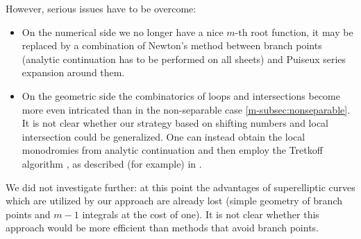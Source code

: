 \documentclass[main.tex]{subfiles}
\begin{document}
  However, serious issues have to be overcome:
  \begin{itemize}
      \item On the numerical side we no longer have a nice $m$-th root function,
          it may be replaced by a combination of Newton's method between branch
          points (analytic continuation has to
          be performed on all sheets) and
          Puiseux series expansion around them.
      \item On the geometric side the combinatorics of loops and intersections
          become more even intricated than in the non-separable case \ref{m-subsec:nonseparable}.
          It is not clear whether our strategy
          based on shifting numbers and local intersection could be generalized.
          One can instead obtain the local monodromies from analytic continuation  
          and then employ the Tretkoff algorithm \cite{TT1984}, as described (for example) in \cite{FrauendienerKlein2016}.
  \end{itemize}
  We did not investigate further: at this point the advantages
  of superelliptic curves which are utilized by our approach are already lost
  (simple geometry of branch points and $m-1$ integrals at the cost of one).
  It is not clear whether this approach would
  be more efficient than methods that avoid branch points.

  \biblio
  
\end{document}
